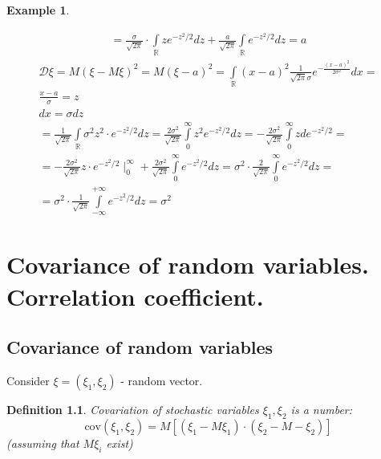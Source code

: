 \documentclass[12pt,letterpaper]{report}
\newtheorem*{example}{Example}
\newtheorem{definition}{Definition}
\begin{document}
\begin{example}
\begin{itemize}
\begin{gather*}
            = \frac{\sigma}{\sqrt{2\pi}} \cdot \int\limits_{\mathbb{R}}^{} z e^{-z^2/2} dz + 
                \frac{a}{\sqrt{2\pi}} \int\limits_{\mathbb{R}}^{} e^{-z^2/2} dz = a
            \end{gather*}
            \begin{gather*}
                \mathcal{D}\xi = M(\xi -M\xi)^2 = M(\xi -a)^2 =
                \int\limits_{\mathbb{R}}^{} (x-a)^2 \frac{1}{\sqrt{2\pi}\sigma} e^{-\frac{(x-a)^2}{2\sigma^2}}dx = \\
                \frac{x-a}{\sigma} = z \\
                dx = \sigma dz \\
                = \frac{1}{\sqrt{2\pi}} \int\limits_{\mathbb{R}}^{} \sigma^2 z^2 \cdot e^{-z^2/2} dz =
                \frac{2\sigma^2}{\sqrt{2\pi}} \int\limits_{0}^{\infty} z^2 e^{-z^2/2} dz =
                - \frac{2\sigma^2}{\sqrt{2\pi}} \int\limits_{0}^{\infty} z de^{-z^2/2} = \\
                = -\frac{2\sigma^2}{\sqrt{2\pi}} z \cdot e^{-z^2/2} \mid_0^{\infty} +
                    \frac{2\sigma^2}{\sqrt{2\pi}} \int\limits_{0}^{\infty} e^{-z^2/2} dz =
                \sigma^2\cdot \frac{2}{\sqrt{2\pi}} \int\limits_{0}^{\infty} e^{-z^2/2}dz = \\
                = \sigma^2 \cdot \frac{1}{\sqrt{2\pi}} \int\limits_{-\infty}^{+\infty} e^{-z^2/2}dz = \sigma^2
            \end{gather*}
        \end{itemize}
\end{example}




\chapter{Covariance of random variables. Correlation coefficient.}

\section{Covariance of random variables}

Consider $\xi = (\xi_1, \xi_2)$ - random vector.

\begin{definition}
    Covariation of stochastic variables $\xi_1, \xi_2$ is a number:
    \begin{equation}
        \text{cov}(\xi_1, \xi_2) = M[(\xi_1 -M\xi_1) \cdot(\xi_2 - M-\xi_2)]
    \end{equation}
    (assuming that $M\xi_i$ exist)

\end{definition}
\end{document}
